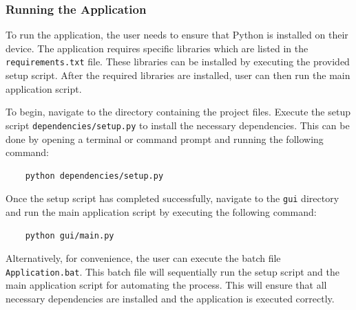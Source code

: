 \subsubsection{Running the Application}

To run the application, the user needs to ensure that Python is installed on their device. The application requires specific libraries which are listed in the \texttt{requirements.txt} file. These libraries can be installed by executing the provided setup script. After the required libraries are installed, user can then run the main application script.

To begin, navigate to the directory containing the project files. Execute the setup script \texttt{dependencies/setup.py} to install the necessary dependencies. This can be done by opening a terminal or command prompt and running the following command:

\begin{verbatim}
	python dependencies/setup.py
\end{verbatim}

Once the setup script has completed successfully, navigate to the \texttt{gui} directory and run the main application script by executing the following command:

\begin{verbatim}
	python gui/main.py
\end{verbatim}

Alternatively, for convenience, the user can execute the batch file \texttt{Application.bat}. This batch file will sequentially run the setup script and the main application script for automating the process. This will ensure that all necessary dependencies are installed and the application is executed correctly.

